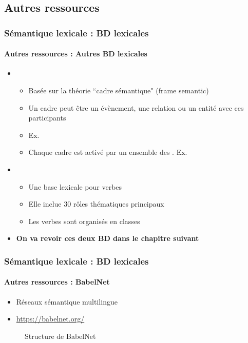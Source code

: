 \documentclass[xcolor=table]{beamer}
\begin{document}
\subsection{Autres ressources}

\begin{frame}
\frametitle{Sémantique lexicale : BD lexicales}
\framesubtitle{Autres ressources : Autres BD lexicales}
	
\begin{itemize}
	\item {} 
	\begin{itemize}
		\item Basée sur la théorie ``cadre sémantique" (frame semantic)
		\item Un cadre peut être un évènement, une relation ou un entité avec ces participants 
		\item Ex. 
		\item Chaque cadre est activé par un ensemble des . Ex. 
	\end{itemize}
	\item {} 
	\begin{itemize}
		\item Une base lexicale pour verbes
		\item Elle inclue 30 rôles thématiques principaux 
		\item Les verbes sont organisés en classes
	\end{itemize}
	\item \textbf{On va revoir ces deux BD dans le chapitre suivant}
\end{itemize}
	
\end{frame}

\begin{frame}
\frametitle{Sémantique lexicale : BD lexicales}
\framesubtitle{Autres ressources : BabelNet}

\begin{itemize}
	\item Réseaux sémantique multilingue
	\item \url{https://babelnet.org/}
\end{itemize}

\begin{figure}
	\caption{Structure de BabelNet \cite{2012-navigli-ponzetto}}
\end{figure}
	
\end{frame}
\end{document}
